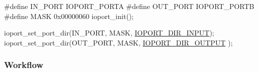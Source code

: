 \begin{DoxyCode}
\textcolor{preprocessor}{         #define IN\_PORT  IOPORT\_PORTA}
\textcolor{preprocessor}{}\textcolor{preprocessor}{         #define OUT\_PORT IOPORT\_PORTB}
\textcolor{preprocessor}{}\textcolor{preprocessor}{         #define MASK     0x00000060}
\textcolor{preprocessor}{}
         ioport\_init();

         ioport\_set\_port\_dir(IN\_PORT, MASK, \hyperlink{group__ioport__group_gga9c267f89800e58bd9dfd74e662a4a4c1af854a0dce084e5a8e8744f9a502e7b7b}{IOPORT\_DIR\_INPUT});
         ioport\_set\_port\_dir(OUT\_PORT, MASK, \hyperlink{group__ioport__group_gga9c267f89800e58bd9dfd74e662a4a4c1a06de24313dad0169f3a366c62a84f4cc}{IOPORT\_DIR\_OUTPUT}
      );
\end{DoxyCode}
\hypertarget{ioport_quickstart_use_case_1_ioport_quickstart_basic_setup_flow}{}\subsubsection{Workflow}\label{ioport_quickstart_use_case_1_ioport_quickstart_basic_setup_flow}

